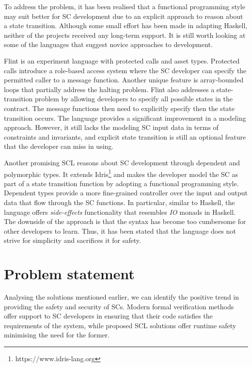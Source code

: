 \documentclass[oneside]{ecsproject}     %
\begin{document}
To address the problem, it has been realised that a functional programming style may suit better for SC development due to
an explicit approach to reason about a state transition. Although some small effort has been made in adapting Haskell,
neither of the projects received any long-term support. It is still worth looking at some of the languages that suggest novice approaches to development. 

Flint is an experiment language with protected calls and asset types\cite{flint}. Protected calls introduce a role-based access system
where the SC developer can specify the permitted caller to a message function. Another unique feature is array-bounded loops
that partially address the halting problem. Flint also addresses a state-transition problem by allowing developers to specify
all possible states in the contract. The message functions then need to explicitly specify then the state transition occurs.
The language provides a significant improvement in a modeling approach. However, it still lacks the modeling SC input data in terms
of constraints and invariants, and explicit state transition is still an optional feature that the developer can miss in using.

Another promising SCL reasons about SC development through dependent and polymorphic types\cite{idris}. It extends Idris\footnote{https://www.idris-lang.org} 
and makes the developer model the SC as part of a state transition function by adopting a functional programming style. Dependent types provide a more
fine-grained controller over the input and output data that flow through the SC functions. In particular, similar to Haskell, the language offers \textit{side-effects} 
functionality that resembles \textit{IO} monads in Haskell. The downside of the approach is that the syntax has become too cumbersome for other developers to learn. Thus,
it has been stated that the language does not strive for simplicity and sacrifices it for safety.


\section{Problem statement}

Analysing the solutions mentioned earlier, we can identify the positive trend in providing the safety and security of SCs.
Modern formal verification methods offer support to SC developers in ensuring that their code satisfies the requirements of the system, while
proposed SCL solutions offer runtime safety minimising the need for the former.
\end{document}
